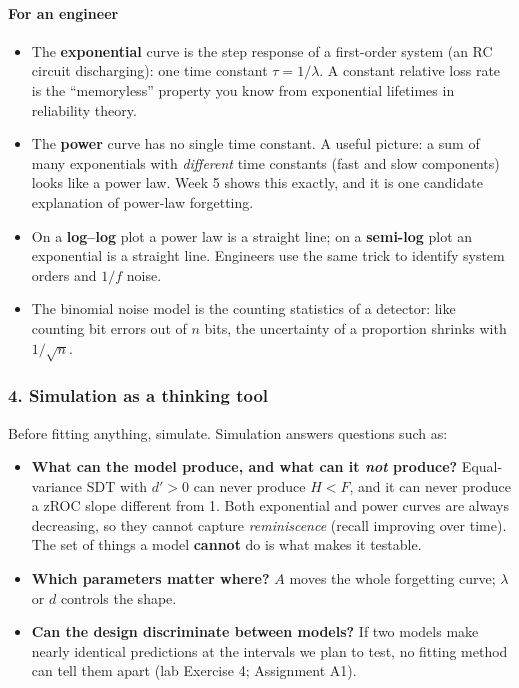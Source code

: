 \paragraph{For an engineer}

\begin{itemize}
\tightlist
\item
  The \textbf{exponential} curve is the step response of a first-order
  system (an RC circuit discharging): one time constant
  \(\tau = 1/\lambda\). A constant relative loss rate is the
  ``memoryless'' property you know from exponential lifetimes in
  reliability theory.
\item
  The \textbf{power} curve has no single time constant. A useful
  picture: a sum of many exponentials with \emph{different} time
  constants (fast and slow components) looks like a power law. Week 5
  shows this exactly, and it is one candidate explanation of power-law
  forgetting.
\item
  On a \textbf{log--log} plot a power law is a straight line; on a
  \textbf{semi-log} plot an exponential is a straight line. Engineers
  use the same trick to identify system orders and \(1/f\) noise.
\item
  The binomial noise model is the counting statistics of a detector:
  like counting bit errors out of \(n\) bits, the uncertainty of a
  proportion shrinks with \(1/\sqrt{n}\).
\end{itemize}

\subsubsection{4. Simulation as a thinking tool}

Before fitting anything, simulate. Simulation answers questions such as:

\begin{itemize}
\tightlist
\item
  \textbf{What can the model produce, and what can it \emph{not}
  produce?} Equal-variance SDT with \(d' > 0\) can never produce
  \(H < F\), and it can never produce a zROC slope different from 1.
  Both exponential and power curves are always decreasing, so they
  cannot capture \emph{reminiscence} (recall improving over time). The
  set of things a model \textbf{cannot} do is what makes it testable.
\item
  \textbf{Which parameters matter where?} \(A\) moves the whole
  forgetting curve; \(\lambda\) or \(d\) controls the shape.
\item
  \textbf{Can the design discriminate between models?} If two models
  make nearly identical predictions at the intervals we plan to test, no
  fitting method can tell them apart (lab Exercise 4; Assignment A1).
\end{itemize}

